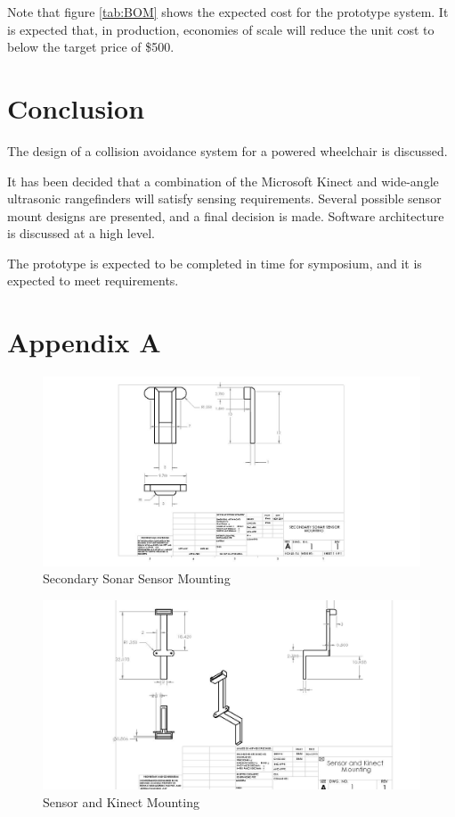 \documentclass[oneside,final,a4paper]{report}
\begin{document}
Note that figure \ref{tab:BOM} shows the expected cost for the prototype system.  It is expected that, in production, economies of scale will reduce the unit cost to below the target price of \$500.

\chapter{Conclusion}

The design of a collision avoidance system for a powered wheelchair is discussed.

It has been decided that a combination of the Microsoft Kinect and wide-angle ultrasonic rangefinders will satisfy sensing requirements.  Several possible sensor mount designs are presented, and a final decision is made.  Software architecture is discussed at a high level.

The prototype is expected to be completed in time for symposium, and it is expected to meet requirements.

\chapter*{Appendix A} \label{mech_drawings}
\begin{figure}[hbt]
 \centering
 \includegraphics[scale=0.65]{Drawing_Left}
 \caption{Secondary Sonar Sensor Mounting}
\end{figure}

\begin{figure}[hbt]
 \centering
 \includegraphics[scale=0.5]{Drawing_Right}
 \caption{Sensor and Kinect Mounting}
\end{figure}
\end{document}

